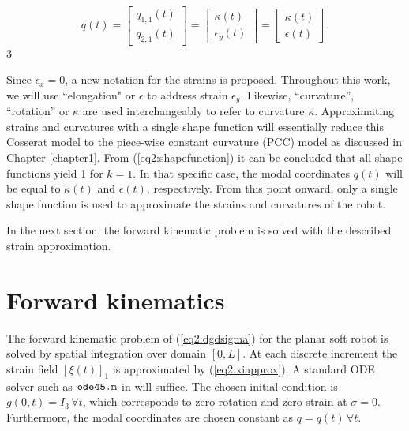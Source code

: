 \begin{equation}
q(t) = \begin{bmatrix} q_{1,1}(t) \\ q_{2,1}(t) \end{bmatrix} = \begin{bmatrix} \kappa(t) \\ \epsilon_y(t) \end{bmatrix} = \begin{bmatrix} \kappa(t) \\ \epsilon(t) \end{bmatrix}.
\end{equation}3

Since $\epsilon_x = 0$, a new notation for the strains is proposed. Throughout this work, we will use ``elongation" or $\epsilon$ to address strain $\epsilon_y$. Likewise, ``curvature'', ``rotation'' or  $\kappa$ are used interchangeably to refer to curvature $\kappa$. Approximating strains and curvatures with a single shape function will essentially reduce this Cosserat model to the piece-wise constant curvature (PCC) model as discussed in Chapter \ref{chapter1}. From (\ref{eq2:shapefunction}) it can be concluded that all shape functions yield 1 for $k=1$. In that specific case, the modal coordinates $q(t)$ will be equal to $\kappa(t)$ and $\epsilon(t)$, respectively. From this point onward, only a single shape function is used to approximate the strains and curvatures of the robot. 

In the next section, the forward kinematic problem is solved with the described strain approximation.




\section{Forward kinematics}

The forward kinematic problem of (\ref{eq2:dgdsigma}) for the
planar soft robot is solved by spatial integration over domain $[0,L]$. At each discrete increment the strain field $[\xi(t)]_1$ is approximated by (\ref{eq2:xiapprox}). A standard ODE solver such as $\verb+ode45.m+$ in \MATLAB \cite{MATLAB2020} will suffice. The chosen initial condition is $g(0,t) = I_3 \hspace{2pt} \forall t$, which corresponds to zero rotation and zero strain at $\sigma = 0$. Furthermore, the modal coordinates are chosen constant as $q = q(t) \hspace{2pt} \forall t$. 



